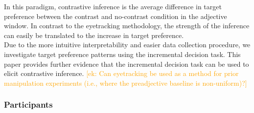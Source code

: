 \documentclass[a4paper,man,floatsintext,natbib]{apa6}
\newcommand{\ek}[1]{\textcolor{Orange}{[ek: #1]}}
\begin{document}
In this paradigm, contrastive inference is the average difference in target preference between the contrast and no-contrast condition in the adjective window. In contrast to the eyetracking methodology, the strength of the inference can easily be translated to the increase in target preference.\\
Due to the more intuitive interpretability and easier data collection procedure, we investigate target preference patterns using the incremental decision task. This paper provides further evidence that the incremental decision task can be used to elicit contrastive inference.
\ek{Can eyetracking be used as a method for prior manipulation experiments (i.e., where the preadjective baseline is non-uniform)?}


\subsubsection{Participants}


\end{document}
